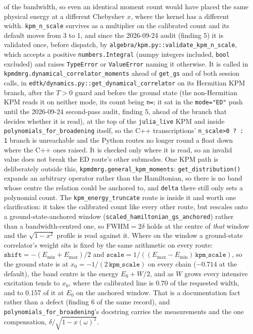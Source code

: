\documentclass[11pt]{article}
\begin{document}
of the bandwidth, so even an identical moment count would have placed the
same physical energy at a different Chebyshev $x$, where the kernel has a
different width. \texttt{kpm\_n\_scale} survives as a multiplier on the
calibrated count and its default moves from 3 to 1, and since the
2026-09-24 audit (finding 5) it is validated once, before dispatch, by
\texttt{algebra/kpm.py::validate\_kpm\_n\_scale}, which accepts a
positive \texttt{numbers.Integral} (numpy integers included,
\texttt{bool} excluded) and raises \texttt{TypeError} or
\texttt{ValueError} naming it otherwise. It is called in
\texttt{kpmdmrg.dynamical\_correlator\_moments} ahead of
\texttt{get\_gs} and of both session calls, in
\texttt{edtk/dynamics.py::get\_dynamical\_correlator} on its Hermitian
KPM branch, after the $T>0$ guard and before the ground state (the
non-Hermitian KPM reads it on neither mode, its count being
\texttt{n=}; it sat in the \texttt{mode="ED"} push until the 2026-09-24
second-pass audit, finding 5, ahead of the branch that decides whether it
is read), at
the top of the \texttt{julia\_live} KPM and inside
\texttt{polynomials\_for\_broadening} itself, so the C++
transcriptions' \texttt{n\_scale>0 ? : 1} branch is unreachable and the
Python routes no longer round a float down where the C++ ones raised.
It is checked only where it is read, so an invalid value does not break
the ED route's other submodes. One KPM path is
deliberately outside this, \texttt{kpmdmrg.general\_kpm\_moments}:
\texttt{get\_distribution()} expands an arbitrary operator rather than
the Hamiltonian, so there is no band whose centre the relation could be
anchored to, and \texttt{delta} there still only sets a polynomial count.
The \texttt{kpm\_energy\_truncate} route is inside it and worth one
clarification: it takes the calibrated count like every other route, but
rescales onto a ground-state-anchored window
(\texttt{scaled\_hamiltonian\_gs\_anchored}) rather than a
bandwidth-centred one, so $\mathrm{FWHM} = 2\delta$ holds at the centre
of \emph{that} window and the $\sqrt{1-x^2}$ profile is read against it.
Where on the window a ground-state correlator's weight sits is fixed by
the same arithmetic on every route:
$\texttt{shift} = -(E_{\min}+E_{\max})/2$ and
$\texttt{scale} = 1/((E_{\max}-E_{\min})\,\texttt{kpm\_scale})$, so the
ground state is at $x_0 = -1/(2\,\texttt{kpm\_scale})$ on every chain
($-0.714$ at the default), the band centre is the energy $E_0 + W/2$,
and as $W$ grows every intensive excitation tends to $x_0$, where the
calibrated line is 0.70 of the requested width, and to 0.157 of it at
$E_0$ on the anchored window. That is a documentation fact rather than a
defect (finding 6 of the same record), and
\texttt{polynomials\_for\_broadening}'s docstring carries the
measurements and the one compensation,
$\delta/\sqrt{1-x(\omega)^2}$.
\end{document}
